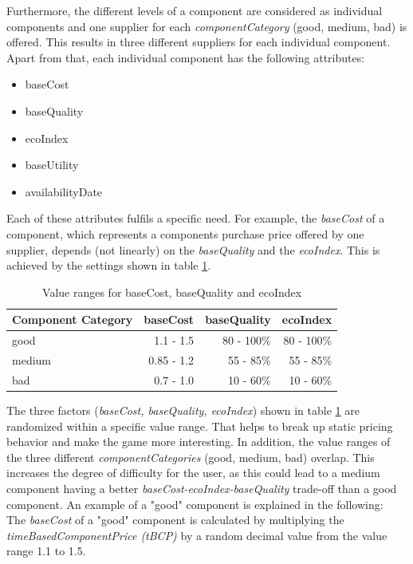 Furthermore, the different levels of a component are considered as individual components and one supplier for each \textit{componentCategory} (good, medium, bad) is offered. This results in three different suppliers for each individual component. Apart from that, each individual component has the following attributes:
\begin{itemize}
    \item baseCost
    \item baseQuality
    \item ecoIndex
    \item baseUtility
    \item availabilityDate
\end{itemize}
Each of these attributes fulfils a specific need. For example, the \textit{baseCost} of a component, which represents a components purchase price offered by one supplier, depends (not linearly) on the \textit{baseQuality} and the \textit{ecoIndex}. This is achieved by the settings shown in table \ref{component_price_calculation}.
    \begin{table}[ht]
    \centering
    \begin{tabular}{|l|r|r|r|}
    \hline
    Component Category & baseCost & baseQuality & ecoIndex \\
    \hline
    good & 1.1 - 1.5 & 80 - 100\% & 80 - 100\% \\
    medium & 0.85 - 1.2 & 55 - 85\% & 55 - 85\%\\
    bad  & 0.7 - 1.0 & 10 - 60\% & 10 - 60\%\\
    \hline
    \end{tabular}
    \caption{Value ranges for baseCost, baseQuality and ecoIndex}
    \label{component_price_calculation}
    \end{table}
\newline
The three factors (\textit{baseCost, baseQuality, ecoIndex}) shown in table \ref{component_price_calculation} are randomized within a specific value range. That helps to break up static pricing behavior and make the game more interesting. In addition, the value ranges of the three different \textit{componentCategories} (good, medium, bad) overlap. This increases the degree of difficulty for the user, as this could lead to a medium component having a better \textit{baseCost-ecoIndex-baseQuality} trade-off than a good component. An example of a "good" component is explained in the following:\\
The \textit{baseCost} of a "good" component is calculated by multiplying the \textit{timeBasedComponentPrice (tBCP)} by a random decimal value from the value range 1.1 to 1.5.
